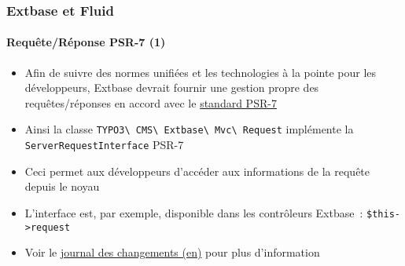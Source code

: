 %

\begin{frame}[fragile]
	\frametitle{Extbase et Fluid}
	\framesubtitle{Requête/Réponse PSR-7 (1)}

	\begin{itemize}
		\item Afin de suivre des normes unifiées et les technologies à la pointe pour les développeurs,
			Extbase devrait fournir une gestion propre des requêtes/réponses en accord avec le
			\href{https://www.php-fig.org/psr/psr-7/}{standard PSR-7}
		\item Ainsi la classe
			\small\texttt{TYPO3\textbackslash
				CMS\textbackslash
				Extbase\textbackslash
				Mvc\textbackslash
				Request}\normalsize\newline
			implémente la \texttt{ServerRequestInterface} PSR-7
		\item Ceci permet aux développeurs d'accéder aux informations de la requête depuis le noyau
		\item L'interface est, par exemple, disponible dans les contrôleurs Extbase~:\newline
			\texttt{\$this->request}
		\item Voir le
			\href{https://docs.typo3.org/c/typo3/cms-core/master/en-us/Changelog/11.3/Feature-94428-ExtbaseRequestImplementsServerRequestInterface.html}{journal des changements (en)}
			pour plus d'information
	\end{itemize}

\end{frame}


